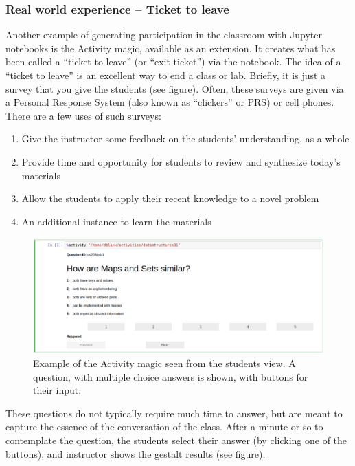 \documentclass[]{book}
\providecommand{\tightlist}{%
  \setlength{\itemsep}{0pt}\setlength{\parskip}{0pt}}
\begin{document}
\hypertarget{real-world-experience-ticket-to-leave}{%
\subsubsection{Real world experience -- Ticket to leave}\label{real-world-experience-ticket-to-leave}}

Another example of generating participation in the classroom with Jupyter
notebooks is the Activity magic, available as an extension. It creates what has
been called a ``ticket to leave'' (or ``exit ticket'') via the notebook. The idea of
a ``ticket to leave'' is an excellent way to end a class or lab. Briefly, it is
just a survey that you give the students (see figure). Often, these surveys are
given via a Personal Response System (also known as ``clickers'' or PRS) or cell
phones. There are a few uses of such surveys:

\begin{enumerate}
\def\labelenumi{\arabic{enumi}.}
\tightlist
\item
  Give the instructor some feedback on the students' understanding, as a whole
\item
  Provide time and opportunity for students to review and synthesize today's
  materials
\item
  Allow the students to apply their recent knowledge to a novel problem
\item
  An additional instance to learn the materials
\end{enumerate}

\begin{figure}
\centering
\includegraphics{images/activity-magic-student.png}
\caption{Example of the Activity magic seen from the students view. A question, with multiple choice answers is shown, with buttons for their input.}
\end{figure}

These questions do not typically require much time to answer, but are meant to
capture the essence of the conversation of the class. After a minute or so to
contemplate the question, the students select their answer (by clicking one of
the buttons), and instructor shows the gestalt results (see figure).
\end{document}
